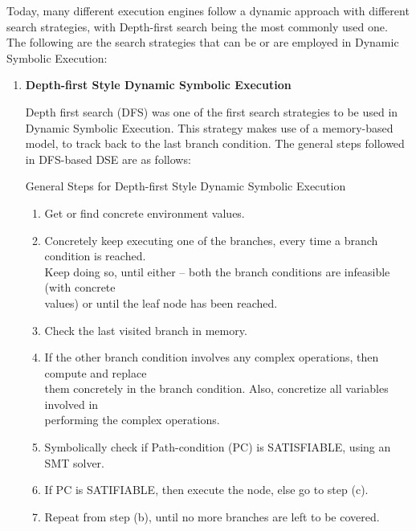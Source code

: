 \documentclass[11pt]{llncs}
\begin{document}
		\vspace{2mm}

		Today, many different execution engines follow a dynamic approach with different search strategies, with Depth-first search being the most commonly used one.\\

		The following are the search strategies that can be or are employed in Dynamic Symbolic Execution:
		\begin{enumerate}
			\item \textbf{Depth-first Style Dynamic Symbolic Execution}
    
				Depth first search (DFS) was one of the first search strategies to be used in Dynamic Symbolic Execution. \cite{1_Search_Strategies_DSE} This strategy makes use of a memory-based model, to track back to the last branch condition. The general steps followed in DFS-based DSE are as follows:\\

				\begin{algorithm}[H]
					\caption{General Steps for Depth-first Style Dynamic Symbolic Execution}  \label{algorithm_2}
					
					\DontPrintSemicolon
					\SetAlgoLined
					
					
					\begin{enumerate}
						\item Get or find concrete environment values.
						\item Concretely keep executing one of the branches, every time a branch condition is reached. \\Keep doing so, until either – both the branch conditions are infeasible (with concrete \\values) or until the leaf node has been reached.
						\item Check the last visited branch in memory.
						\item If the other branch condition involves any complex operations, then compute and replace \\them concretely in the branch condition. Also, concretize all variables involved in\\ performing the complex operations.
						\item Symbolically check if Path-condition (PC) is SATISFIABLE, using an SMT solver.
						\item If PC is SATIFIABLE, then execute the node, else go to step (c).
						\item Repeat from step (b), until no more branches are left to be covered.
					\end{enumerate}
				\end{algorithm}
				~


\end{enumerate}
\end{document}
